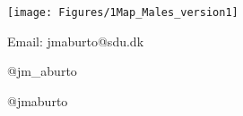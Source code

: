 \documentclass[xcolor={dvipsnames}]{beamer}
\begin{document}
\begin{frame}
 \begin{center}





\texttt{[image: Figures/1Map\_Males\_version1]} \\   

	\bigskip

Email: jmaburto@sdu.dk 

\faTwitter \quad  @jm\_aburto 

\faGithub \quad @jmaburto 
 

\end{center}
 
 

\end{frame}
\end{document}
